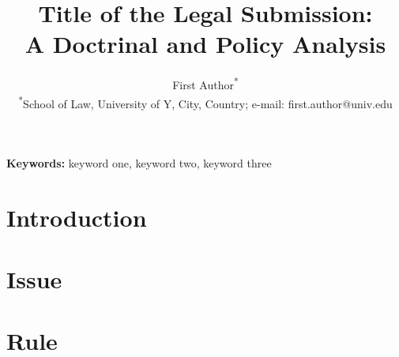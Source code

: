 \documentclass[11pt,a4paper]{article}
\title{Title of the Legal Submission: \\ A Doctrinal and Policy Analysis}
\author{First Author\textsuperscript{*}\\
\textsuperscript{*}School of Law, University of Y, City, Country; e-mail: first.author@univ.edu}
\date{}
\newcommand{\case}[1]{\textit{#1}}  %
\begin{document}
\maketitle

\begin{abstract}
\end{abstract}

\noindent\textbf{Keywords:} %
keyword one, keyword two, keyword three

\section{Introduction}
\label{sec:intro}

\section{Issue}
\label{sec:issue}

\section{Rule}
\label{sec:rule}
\end{document}

